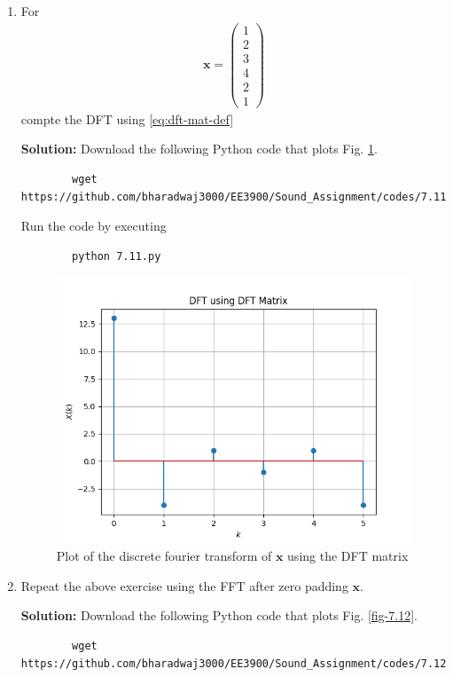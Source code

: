 \documentclass[journal,12pt,twocolumn]{IEEEtran}
\newcommand{\solution}{\noindent \textbf{Solution: }}
\let\vec\mathbf
\numberwithin{equation}{section}
\renewcommand\thesection{\arabic{section}}
\newcommand{\myvec}[1]{\ensuremath{\begin{pmatrix}#1\end{pmatrix}}}
\begin{document}
\begin{enumerate}[label=\thesection.\arabic*]
\item For 
    \begin{align}
	    \vec{x} = \myvec{1\\2\\3\\4\\2\\1}
        \label{eq:equation1}
    \end{align}
    compte the DFT  
		using 
	    \eqref{eq:dft-mat-def}
	    
	\solution Download the following Python code that plots Fig. \ref{fig-7.11}.
	\begin{lstlisting}
		wget https://github.com/bharadwaj3000/EE3900/Sound_Assignment/codes/7.11.py
	\end{lstlisting}
	
	Run the code by executing
	\begin{lstlisting}
		python 7.11.py
	\end{lstlisting}

	\begin{figure}[!ht]
		\centering
		\includegraphics[width=\columnwidth]{./figs/7.11.png}
		\caption{Plot of the discrete fourier transform of $\vec{x}$ using the DFT matrix}
		\label{fig-7.11}	
	\end{figure}
	
	
    \item Repeat the above exercise using the FFT
	    after zero padding $\vec{x}$.

	\solution Download the following Python code that plots Fig. \ref{fig-7.12}.
	\begin{lstlisting}
		wget https://github.com/bharadwaj3000/EE3900/Sound_Assignment/codes/7.12.py
	\end{lstlisting}
	

\end{enumerate}
\end{document}
